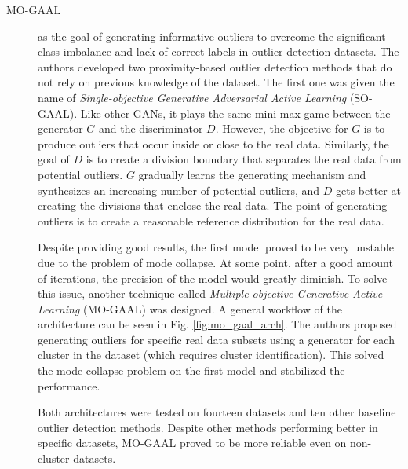 \begin{description}
    \item[MO-GAAL \cite{liu.etal_GenerativeAdversarialActive_2020}] as the goal of generating informative outliers to overcome the significant class imbalance and lack of correct labels in outlier detection datasets. The authors developed two proximity-based outlier detection methods that do not rely on previous knowledge of the dataset. The first one was given the name of \textit{Single-objective Generative Adversarial Active Learning} (SO-GAAL). Like other GANs, it plays the same mini-max game between the generator $G$ and the discriminator $D$. However, the objective for $G$ is to produce outliers that occur inside or close to the real data. Similarly, the goal of $D$ is to create a division boundary that separates the real data from potential outliers. $G$ gradually learns the generating mechanism and synthesizes an increasing number of potential outliers, and $D$ gets better at creating the divisions that enclose the real data. The point of generating outliers is to create a reasonable reference distribution for the real data. 
    
    Despite providing good results, the first model proved to be very unstable due to the problem of mode collapse. At some point, after a good amount of iterations, the precision of the model would greatly diminish. To solve this issue, another technique called \textit{Multiple-objective Generative Active Learning} (MO-GAAL) was designed. A general workflow of the architecture can be seen in Fig. \ref{fig:mo_gaal_arch}. The authors proposed generating outliers for specific real data subsets using a generator for each cluster in the dataset (which requires cluster identification). This solved the mode collapse problem on the first model and stabilized the performance.  
    
    Both architectures were tested on fourteen datasets and ten other baseline outlier detection methods. Despite other methods performing better in specific datasets, MO-GAAL proved to be more reliable even on non-cluster datasets.
\end{description}

